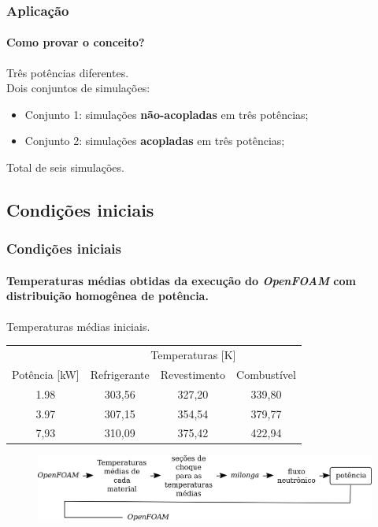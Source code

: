 \documentclass[svgnames,smaller,table]{beamer}
\begin{document}
\begin{frame}
  \frametitle{Aplicação}
  \framesubtitle{Como provar o conceito?}
  Três potências diferentes.
  \\
  \vspace{0.2cm}
  Dois conjuntos de simulações:
  \vspace{0.2cm}
  \begin{itemize}
  \item Conjunto 1: simulações \textbf{não-acopladas} em três potências; 
  \item Conjunto 2: simulações \textbf{acopladas} em três potências; 
  \end{itemize}
  \vspace{0.2cm}
  Total de seis simulações.
  
\end{frame}

\subsection{Condições iniciais}
\begin{frame}
  \frametitle{Condições iniciais}
  \framesubtitle{Temperaturas médias obtidas da execução do \textit{OpenFOAM} com distribuição homogênea de potência.}
  
    \centering
    Temperaturas médias iniciais.
    \\
    \vspace{0.5cm}
    \label{tab:temp-keff}
    \begin{tabular}{cccc}
      \multicolumn{1}{l}{}         & \multicolumn{3}{c}{Temperaturas [K]}                                                                        \\ \cline{2-4}
      \multicolumn{1}{c}{Potência [kW]} & \multicolumn{1}{c}{Refrigerante} & \multicolumn{1}{c}{Revestimento} & \multicolumn{1}{c}{Combustível}  \\ \hline
      1.98                      & 303,56                         & 327,20                         & 339,80                           \\ \hline
      3.97                      & 307,15                         & 354,54                         & 379,77                           \\ \hline
      7,93                      & 310,09                         & 375,42                         & 422,94                                         
    \end{tabular}
    \vspace{0.5cm}
    \begin{figure}[htb]
    \centering\includegraphics[scale=0.6]{../figuras/initial-condition.png}
    \end{figure}
    \end{frame}
\end{document}
